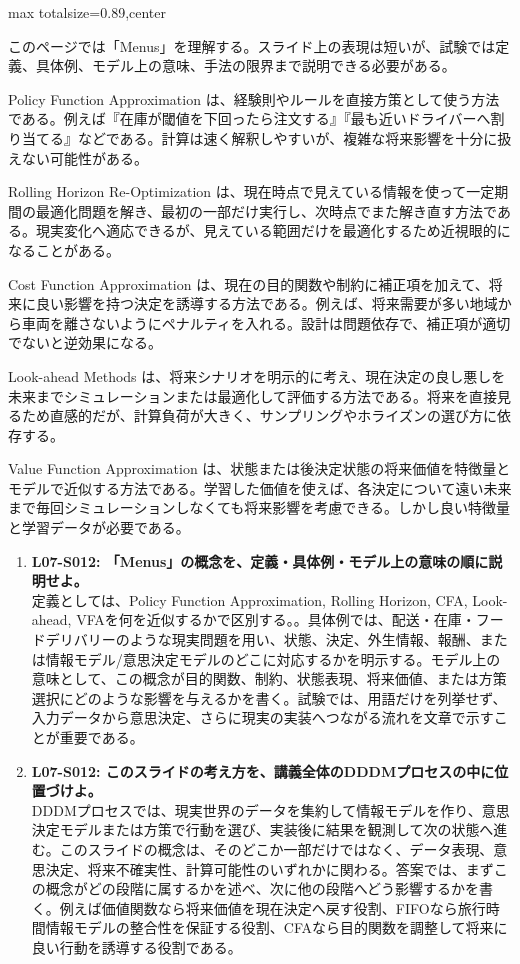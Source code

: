 \begin{minipage}[t]{0.58\textwidth}
\begin{adjustbox}{max totalsize={\textwidth}{0.89\textheight},center}
\begin{minipage}{\textwidth}\scriptsize
{}このページでは「Menus」を理解する。スライド上の表現は短いが、試験では定義、具体例、モデル上の意味、手法の限界まで説明できる必要がある。\par
Policy Function Approximation は、経験則やルールを直接方策として使う方法である。例えば『在庫が閾値を下回ったら注文する』『最も近いドライバーへ割り当てる』などである。計算は速く解釈しやすいが、複雑な将来影響を十分に扱えない可能性がある。\par
Rolling Horizon Re-Optimization は、現在時点で見えている情報を使って一定期間の最適化問題を解き、最初の一部だけ実行し、次時点でまた解き直す方法である。現実変化へ適応できるが、見えている範囲だけを最適化するため近視眼的になることがある。\par
Cost Function Approximation は、現在の目的関数や制約に補正項を加えて、将来に良い影響を持つ決定を誘導する方法である。例えば、将来需要が多い地域から車両を離さないようにペナルティを入れる。設計は問題依存で、補正項が適切でないと逆効果になる。\par
Look-ahead Methods は、将来シナリオを明示的に考え、現在決定の良し悪しを未来までシミュレーションまたは最適化して評価する方法である。将来を直接見るため直感的だが、計算負荷が大きく、サンプリングやホライズンの選び方に依存する。\par
Value Function Approximation は、状態または後決定状態の将来価値を特徴量とモデルで近似する方法である。学習した価値を使えば、各決定について遠い未来まで毎回シミュレーションしなくても将来影響を考慮できる。しかし良い特徴量と学習データが必要である。\par{}\begin{enumerate}\item \textbf{L07-S012: 「Menus」の概念を、定義・具体例・モデル上の意味の順に説明せよ。}\\定義としては、Policy Function Approximation, Rolling Horizon, CFA, Look-ahead, VFAを何を近似するかで区別する。。具体例では、配送・在庫・フードデリバリーのような現実問題を用い、状態、決定、外生情報、報酬、または情報モデル/意思決定モデルのどこに対応するかを明示する。モデル上の意味として、この概念が目的関数、制約、状態表現、将来価値、または方策選択にどのような影響を与えるかを書く。試験では、用語だけを列挙せず、入力データから意思決定、さらに現実の実装へつながる流れを文章で示すことが重要である。\item \textbf{L07-S012: このスライドの考え方を、講義全体のDDDMプロセスの中に位置づけよ。}\\DDDMプロセスでは、現実世界のデータを集約して情報モデルを作り、意思決定モデルまたは方策で行動を選び、実装後に結果を観測して次の状態へ進む。このスライドの概念は、そのどこか一部だけではなく、データ表現、意思決定、将来不確実性、計算可能性のいずれかに関わる。答案では、まずこの概念がどの段階に属するかを述べ、次に他の段階へどう影響するかを書く。例えば価値関数なら将来価値を現在決定へ戻す役割、FIFOなら旅行時間情報モデルの整合性を保証する役割、CFAなら目的関数を調整して将来に良い行動を誘導する役割である。\end{enumerate}

\end{minipage}
\end{adjustbox}
\end{minipage}
